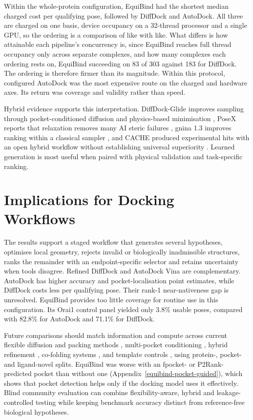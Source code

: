 Within the whole-protein configuration, EquiBind had the shortest median charged cost per qualifying pose, followed by DiffDock and AutoDock. All three are charged on one basis, device occupancy on a 32-thread processor and a single GPU, so the ordering is a comparison of like with like. What differs is how attainable each pipeline's concurrency is, since EquiBind reaches full thread occupancy only across separate complexes, and how many complexes each ordering rests on, EquiBind succeeding on 83 of 303 against 183 for DiffDock. The ordering is therefore firmer than its magnitude. Within this protocol, configured AutoDock was the most expensive route on the charged and hardware axes. Its return was coverage and validity rather than speed.

Hybrid evidence supports this interpretation. DiffDock-Glide improves sampling through pocket-conditioned diffusion and physics-based minimisation \cite{ref064}, PoseX reports that relaxation removes many AI steric failures \cite{ref012}, gnina 1.3 improves ranking within a classical sampler \cite{ref067}, and CACHE produced experimental hits with an open hybrid workflow without establishing universal superiority \cite{ref068}. Learned generation is most useful when paired with physical validation and task-specific ranking.

\hypertarget{implications-for-docking-workflows}{%
\section{Implications for Docking Workflows}\label{implications-for-docking-workflows}}

The results support a staged workflow that generates several hypotheses, optimises local geometry, rejects invalid or biologically inadmissible structures, ranks the remainder with an endpoint-specific selector and retains uncertainty when tools disagree. Refined DiffDock and AutoDock Vina are complementary. AutoDock has higher accuracy and pocket-localisation point estimates, while DiffDock costs less per qualifying pose. Their rank-1 near-nativeness gap is unresolved. EquiBind provides too little coverage for routine use in this configuration. Its Orai1 control panel yielded only 3.8\% usable poses, compared with 82.8\% for AutoDock and 71.1\% for DiffDock.

Future comparisons should match information and compute across current flexible diffusion and packing methods \cite{ref031}, multi-pocket conditioning \cite{ref066}, hybrid refinement \cite{ref064}, co-folding systems \cite{ref012}, \cite{ref069} and template controls \cite{ref065}, using protein-, pocket- and ligand-novel splits. EquiBind was worse with an fpocket- or P2Rank-predicted pocket than without one (Appendix~\ref{equibind-pocket-guided}), which shows that pocket detection helps only if the docking model uses it effectively. Blind community evaluation can combine flexibility-aware, hybrid and leakage-controlled testing \cite{ref047} while keeping benchmark accuracy distinct from reference-free biological hypotheses.

